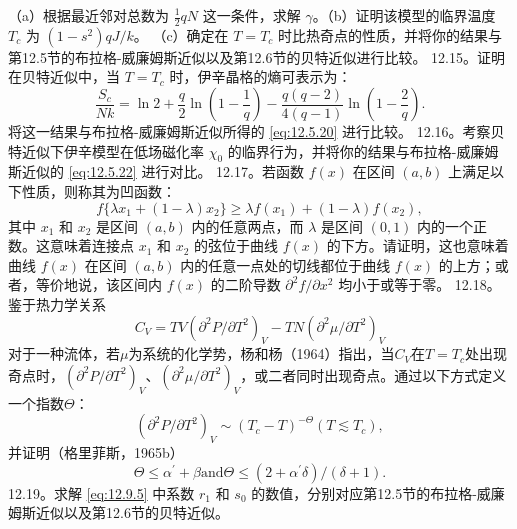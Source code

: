 （a）根据最近邻对总数为 \(\frac{1}{2}qN\) 这一条件，求解 \(\gamma\)。（b）证明该模型的临界温度 \(T_{c}\) 为 \((1-s^{2})qJ/k\)。
（c）确定在 \(T=T_{c}\) 时比热奇点的性质，并将你的结果与第12.5节的布拉格-威廉姆斯近似以及第12.6节的贝特近似进行比较。
12.15。证明在贝特近似中，当 \(T=T_{c}\) 时，伊辛晶格的熵可表示为：
\begin{equation}\tag{12.13.39}\label{eq:12.13.39}
\frac { S _ { c } } { N k } = \ln 2 + \frac { q } { 2 } \ln \left( 1 - \frac { 1 } { q } \right) - \frac { q ( q - 2 ) } { 4 ( q - 1 ) } \ln \left( 1 - \frac { 2 } { q } \right) .
\end{equation}
将这一结果与布拉格-威廉姆斯近似所得的 \autoref{eq:12.5.20} 进行比较。
12.16。考察贝特近似下伊辛模型在低场磁化率 \(\chi_{0}\) 的临界行为，并将你的结果与布拉格-威廉姆斯近似的 \autoref{eq:12.5.22} 进行对比。
12.17。若函数 \(f(x)\) 在区间 \((a,b)\) 上满足以下性质，则称其为凹函数：
\begin{equation}\tag{12.13.40}\label{eq:12.13.40}
f \{ \lambda x _ { 1 } + ( 1 - \lambda ) x _ { 2 } \} \geq \lambda f ( x _ { 1 } ) + ( 1 - \lambda ) f ( x _ { 2 } ) ,
\end{equation}
其中 \(x_{1}\) 和 \(x_{2}\) 是区间 \((a,b)\) 内的任意两点，而 \(\lambda\) 是区间 \((0,1)\) 内的一个正数。这意味着连接点 \(x_{1}\) 和 \(x_{2}\) 的弦位于曲线 \(f(x)\) 的下方。请证明，这也意味着曲线 \(f(x)\) 在区间 \((a,b)\) 内的任意一点处的切线都位于曲线 \(f(x)\) 的上方；或者，等价地说，该区间内 \(f(x)\) 的二阶导数 \(\partial^{2}f/\partial x^{2}\) 均小于或等于零。
12.18。鉴于热力学关系
\begin{equation}\tag{12.13.41}\label{eq:12.13.41}
C _ { V } = T V ( \partial ^{2} P / \partial T ^{2} ) _ { V } - T N ( \partial ^{2} \mu / \partial T ^{2} ) _ { V }
\end{equation}
对于一种流体，若\(\mu\)为系统的化学势，杨和杨（1964）指出，当\(C_V\)在\(T=T_c\)处出现奇点时，\((\partial^2P/\partial T^2)_V\)、\((\partial^2\mu/\partial T^2)_V\)，或二者同时出现奇点。通过以下方式定义一个指数\(\Theta\)：
\begin{equation}\tag{12.13.42}\label{eq:12.13.42}
( \partial ^{2} P / \partial T ^{2} ) _ { V } \sim ( T _ { c } - T ) ^{- \Theta}  ( T \lesssim T _ { c } ) ,
\end{equation}
并证明（格里菲斯，1965b）
\begin{equation}\tag{12.13.43}\label{eq:12.13.43}
\Theta \leq \alpha ^{\prime} + \beta  \mathrm { a n d }  \Theta \leq ( 2 + \alpha ^{\prime} \delta ) / ( \delta + 1 ) .
\end{equation}
12.19。求解 \autoref{eq:12.9.5} 中系数 \(r_{1}\) 和 \(s_{0}\) 的数值，分别对应第12.5节的布拉格-威廉姆斯近似以及第12.6节的贝特近似。

